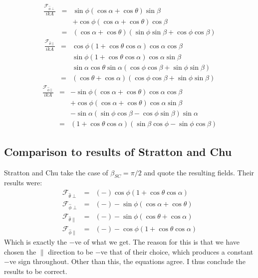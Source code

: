 \documentclass[a4article,12pt]{article}
\newcommand{\Fcal}[1]{{\mathcal F}_{#1}}
\begin{document}
%
\begin{eqnarray}
\frac{\Fcal{\hat{\phi} \perp}}{i k A} & = & \sin \phi  \left(\cos \alpha + \cos \theta \right) \sin \beta \nonumber \\
&& + \cos \phi  \left(\cos \alpha + \cos \theta \right) \cos \beta \nonumber \\
& = & \left(\cos \alpha + \cos \theta \right)  \left( \sin \phi \sin \beta + \cos \phi \cos \beta \right)
\end{eqnarray}
%
\begin{eqnarray}
\frac{\Fcal{\hat{\theta} \parallel}}{i k A} & = & \cos \phi \left( 1 + \cos \theta \cos \alpha \right) \cos \alpha \cos \beta \nonumber \\
&& \sin \phi \left( 1 + \cos \theta \cos \alpha \right) \cos \alpha \sin \beta \nonumber \\
&& \sin \alpha \cos \theta \sin \alpha \left(  \cos \phi \cos \beta + \sin \phi \sin \beta \right) \nonumber \\
& = & \left( \cos \theta + \cos \alpha \right) \left( \cos \phi \cos \beta + \sin \phi \sin \beta  \right) 
\end{eqnarray}
%
\begin{eqnarray}
\frac{\Fcal{\hat{\phi} \parallel}}{i k A} & = & - \sin \phi  \left(\cos \alpha + \cos \theta \right) \cos \alpha \cos \beta \nonumber \\
&& + \cos \phi  \left(\cos \alpha + \cos \theta \right) \cos \alpha \sin \beta \nonumber \\
&& - \sin \alpha \left( \sin \phi \cos \beta - \cos \phi \sin \beta \right) \sin \alpha \nonumber \\
& = & \left( 1+ \cos \theta \cos \alpha \right) \left( \sin \beta \cos \phi - \sin \phi \cos \beta \right)
\end{eqnarray}

\subsection{Comparison to results of Stratton and Chu}

Stratton and Chu take the case of $\beta_{SC} = \pi/2$ and quote the resulting fields. Their results were:
%
\begin{eqnarray}
\Fcal{\hat{\theta} \perp} & = & (-) \cos \phi \left( 1 + \cos \theta \cos \alpha \right) \\
\Fcal{\hat{\phi} \perp} & = & (-) - \sin \phi  \left(\cos \alpha + \cos \theta \right) \\
\Fcal{\hat{\theta} \parallel} & = & (-) -\sin \phi \left( \cos \theta + \cos \alpha \right) \\
\Fcal{\hat{\phi} \parallel} & = & (-)-\cos \phi \left( 1+ \cos \theta \cos \alpha \right) 
\end{eqnarray}
%
Which is exactly the $-$ve of what we get. The reason for this is that we have chosen the $\parallel$ direction to be $-$ve that of their choice, which produces a constant $-$ve sign throughout. Other than this, the equations agree. I thus conclude the results to be correct.
\end{document}
